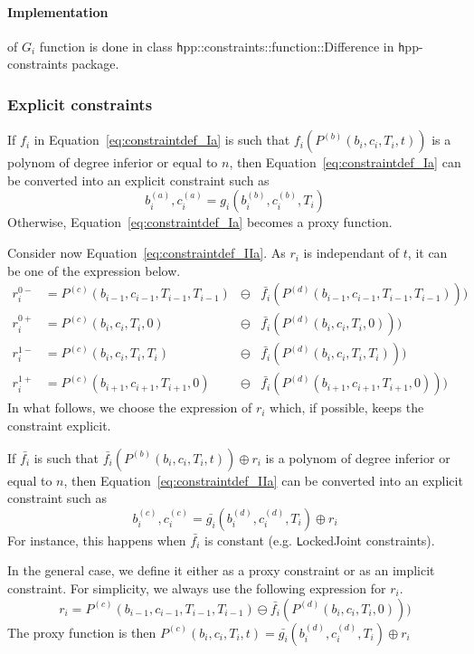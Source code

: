 \documentclass {article}
\newcommand\subspline[5]{P^{#1}(#2, #3, #4, #5)}
\newcommand\subsplinea[3]{\subspline{#1}{b_{#2}}{c_{#2}}{T_{#2}}{#3}}
\begin{document}
\paragraph{Implementation} of $G_i$ function is done in class {\texttt hpp::constraints::function::Difference}
in {\texttt hpp-constraints} package.

\subsubsection{Explicit constraints}
If $f_i$ in Equation~\eqref{eq:constraintdef_Ia}
is such that $f_i(\subsplinea{(b)}{i}{t})$ is a polynom
of degree inferior or equal to $n$, then
Equation~\eqref{eq:constraintdef_Ia} can be converted into
an explicit constraint such as
$$
b_i^{(a)}, c_i^{(a)}  = g_i (b_i^{(b)}, c_i^{(b)}, T_i)
$$
Otherwise, Equation~\eqref{eq:constraintdef_Ia} becomes
a proxy function.

Consider now Equation~\eqref{eq:constraintdef_IIa}.
As $r_i$ is independant of $t$, it can be one of the expression below.
\begin{align*}
  r^{0-}_i &= \subsplinea{(c)}{i-1}{T_{i-1}} &\ominus& \bar{f_i} (\subsplinea{(d)}{i-1}{T_{i-1}})) \\
  r^{0+}_i &= \subsplinea{(c)}{i  }{      0} &\ominus& \bar{f_i} (\subsplinea{(d)}{i  }{      0})) \\
  r^{1-}_i &= \subsplinea{(c)}{i  }{T_{i  }} &\ominus& \bar{f_i} (\subsplinea{(d)}{i  }{T_{i  }})) \\
  r^{1+}_i &= \subsplinea{(c)}{i+1}{      0} &\ominus& \bar{f_i} (\subsplinea{(d)}{i+1}{      0}))
\end{align*}
In what follows, we choose the expression of $r_i$ which, if possible, keeps the constraint explicit.

If $\bar{f_i}$
is such that $\bar{f_i}(\subsplinea{(b)}{i}{t})\oplus r_i$ is a polynom
of degree inferior or equal to $n$, then
Equation~\eqref{eq:constraintdef_IIa} can be converted into
an explicit constraint such as
$$
b_i^{(c)}, c_i^{(c)}  = \bar{g_i} (b_i^{(d)}, c_i^{(d)}, T_i) \oplus r_i
$$
For instance, this happens when $\bar{f_i}$ is constant (e.g. {\texttt LockedJoint} constraints).

In the general case,
we define it either as a proxy constraint or as an implicit constraint.
For simplicity, we always use the following expression for $r_i$.
$$
  r_i = \subsplinea{(c)}{i-1}{T_{i-1}} \ominus \bar{f_i} (\subsplinea{(d)}{i}{0}))
$$
The proxy function is then $
\subsplinea{(c)}{i}{t} = \bar{g_i} (b_i^{(d)}, c_i^{(d)}, T_i) \oplus r_i
$
\end{document}
